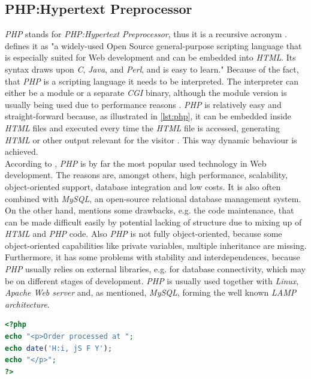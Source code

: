\documentclass[
  a4paper,               %
  twoside,               %
  headings=small,        %
  DIV=12,                %
  BCOR=1cm,              %
  headinclude=true,      %
  footinclude=true,      %
  numbers=noenddot,      %
  11pt]{scrartcl}        %
\begin{document}
\subsection{PHP:Hypertext Preprocessor}

\emph{PHP} stands for \emph{PHP:Hypertext Preprocessor}, thus it is a recursive acronym \cite{PHPPreface}. \cite{PHPPreface} defines it as "a widely-used Open Source general-purpose scripting language that is especially suited for Web development and can be embedded into \textit{HTML}. Its syntax draws upon \textit{C}, \textit{Java}, and \textit{Perl}, and is easy to learn." Because of the fact, that \textit{PHP} is a scripting language it needs to be interpreted. The interpreter can either be a module or a separate \textit{CGI} binary, although the module version is usually being used due to performance reasons \cite{welling2008php}. \textit{PHP} is relatively easy and straight-forward because, as illustrated in \autoref{lst:php}, it can be embedded inside \textit{HTML} files and executed every time the \textit{HTML} file is accessed, generating \textit{HTML} or other output relevant for the visitor \cite{welling2008php}. This way dynamic behaviour is achieved.\\
According to \cite{w3TechsStats}, \textit{PHP} is by far the most popular used technology in Web development. The reasons are, amongst others, high performance, scalability, object-oriented support, database integration and low costs. It is also often combined with \textit{MySQL}, an open-source relational database management system. On the other hand, \cite{bowen2002apache} mentions some drawbacks, e.g. the code maintenance, that can be made difficult easily by potential lacking of structure due to mixing up of \textit{HTML} and \textit{PHP} code. Also \textit{PHP} is not fully object-oriented, because some object-oriented capabilities like private variables, multiple inheritance are missing. Furthermore, it has some problems with stability and interdependences, because \textit{PHP} usually relies on external libraries, e.g. for database connectivity, which may be on different stages of development. \textit{PHP} is usually used together with \textit{Linux}, \textit{Apache Web server} and, as mentioned, \textit{MySQL}, forming the well known \textit{LAMP architecture}. 


\begin{lstlisting}[language=php, captionpos=b,caption={PHP embedded in HTML. Taken from \cite{welling2008php}},label=lst:php]
<?php
echo "<p>Order processed at ";
echo date('H:i, jS F Y');
echo "</p>";
?>

\end{lstlisting}
\end{document}
